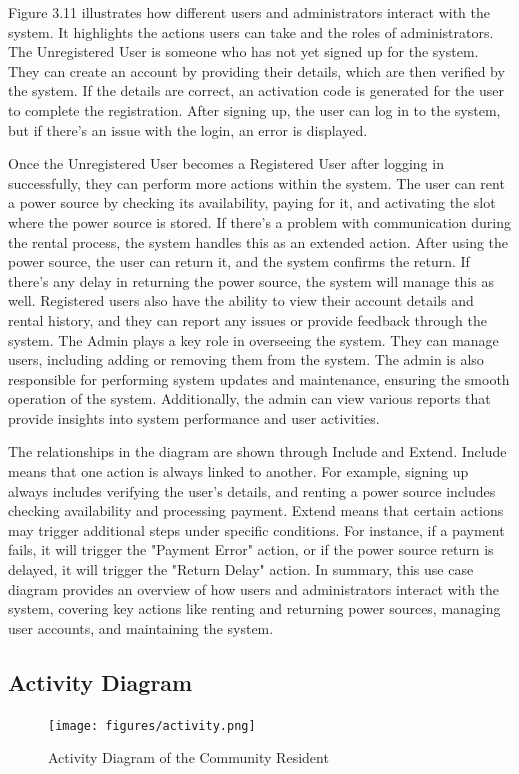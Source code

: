 {Figure 3.11 illustrates how different users and administrators interact with the system. It highlights the actions users can take and the roles of administrators. The Unregistered User is someone who has not yet signed up for the system. They can create an account by providing their details, which are then verified by the system. If the details are correct, an activation code is generated for the user to complete the registration. After signing up, the user can log in to the system, but if there’s an issue with the login, an error is displayed.
 
 Once the Unregistered User becomes a Registered User after logging in successfully, they can perform more actions within the system. The user can rent a power source by checking its availability, paying for it, and activating the slot where the power source is stored. If there’s a problem with communication during the rental process, the system handles this as an extended action. After using the power source, the user can return it, and the system confirms the return. If there’s any delay in returning the power source, the system will manage this as well. Registered users also have the ability to view their account details and rental history, and they can report any issues or provide feedback through the system. The Admin plays a key role in overseeing the system. They can manage users, including adding or removing them from the system. The admin is also responsible for performing system updates and maintenance, ensuring the smooth operation of the system. Additionally, the admin can view various reports that provide insights into system performance and user activities.
 
 The relationships in the diagram are shown through Include and Extend. Include means that one action is always linked to another. For example, signing up always includes verifying the user's details, and renting a power source includes checking availability and processing payment. Extend means that certain actions may trigger additional steps under specific conditions. For instance, if a payment fails, it will trigger the "Payment Error" action, or if the power source return is delayed, it will trigger the "Return Delay" action. In summary, this use case diagram provides an overview of how users and administrators interact with the system, covering key actions like renting and returning power sources, managing user accounts, and maintaining the system.
 
 \subsection{Activity Diagram}
  \begin{figure}[H]
 	\centering
 	\caption{Activity Diagram of the Community Resident}
 	\label{fig:activity}
 	\texttt{[image: figures/activity.png]}
 \end{figure}
 
}
